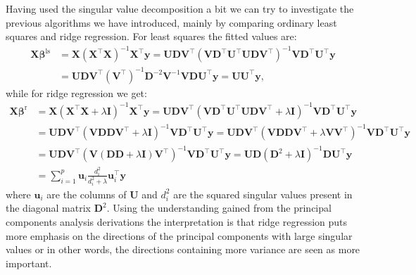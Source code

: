 \documentclass[a4paper, 12pt]{scrartcl}
\newcommand{\bfbeta}{\boldsymbol{\beta}}
\begin{document}
Having used the singular value decomposition a bit we can try to investigate the previous algorithms we have introduced, mainly by comparing ordinary least squares and ridge regression.
For least squares the fitted values are:
\begin{align*}
	\mathbf{X}\bfbeta^\mathrm{ls}&=\mathbf{X}\left(\mathbf{X}^\intercal\mathbf{X}\right)^{-1}\mathbf{X}^\intercal\mathbf{y}
	=\mathbf{U}\mathbf{D}\mathbf{V}^\intercal\left(\mathbf{V}\mathbf{D}^\intercal\mathbf{U}^\intercal\mathbf{U}\mathbf{D}\mathbf{V}^\intercal\right)^{-1}\mathbf{V}\mathbf{D}^\intercal\mathbf{U}^\intercal\mathbf{y}\\
	&=\mathbf{U}\mathbf{D}\mathbf{V}^\intercal\left(\mathbf{V}^\intercal\right)^{-1}\mathbf{D}^{-2}\mathbf{V}^{-1}\mathbf{V}\mathbf{D}\mathbf{U}^\intercal\mathbf{y}
	=\mathbf{U}\mathbf{U}^\intercal\mathbf{y},
\end{align*}
while for ridge regression we get:
\begin{align*}
	\mathbf{X}\bfbeta^\mathrm{r}&=\mathbf{X}\left(\mathbf{X}^\intercal\mathbf{X}+\lambda\mathbf{I}\right)^{-1}\mathbf{X}^\intercal\mathbf{y}
	=\mathbf{U}\mathbf{D}\mathbf{V}^\intercal\left(\mathbf{V}\mathbf{D}^\intercal\mathbf{U}^\intercal\mathbf{U}\mathbf{D}\mathbf{V}^\intercal+\lambda\mathbf{I}\right)^{-1}\mathbf{V}\mathbf{D}^\intercal\mathbf{U}^\intercal\mathbf{y}\\
	&=\mathbf{U}\mathbf{D}\mathbf{V}^\intercal\left(\mathbf{V}\mathbf{D}\mathbf{D}\mathbf{V}^\intercal+\lambda\mathbf{I}\right)^{-1}\mathbf{V}\mathbf{D}^\intercal\mathbf{U}^\intercal\mathbf{y}
	=\mathbf{U}\mathbf{D}\mathbf{V}^\intercal\left(\mathbf{V}\mathbf{D}\mathbf{D}\mathbf{V}^\intercal+\lambda\mathbf{V}\mathbf{V}^\intercal\right)^{-1}\mathbf{V}\mathbf{D}^\intercal\mathbf{U}^\intercal\mathbf{y}\\
	&=\mathbf{U}\mathbf{D}\mathbf{V}^\intercal\left(\mathbf{V}\left(\mathbf{D}\mathbf{D}+\lambda\mathbf{I}\right)\mathbf{V}^\intercal\right)^{-1}\mathbf{V}\mathbf{D}^\intercal\mathbf{U}^\intercal\mathbf{y}
	=\mathbf{U}\mathbf{D}\left(\mathbf{D}^2+\lambda\mathbf{I}\right)^{-1}\mathbf{D}\mathbf{U}^\intercal\mathbf{y}\\
	&=\sum_{i=1}^{p}\mathbf{u}_i\frac{d^2_i}{d^2_i+\lambda}\mathbf{u}_i^\intercal\mathbf{y}
\end{align*}
where $\mathbf{u}_i$ are the columns of $\mathbf{U}$ and $d_i^2$ are the squared singular values present in the diagonal matrix $\mathbf{D}^2$.
Using the understanding gained from the principal components analysis derivations the interpretation is that ridge regression puts more emphasis on the directions of the principal components with large singular values or in other words, the directions containing more variance are seen as more important.
\end{document}
